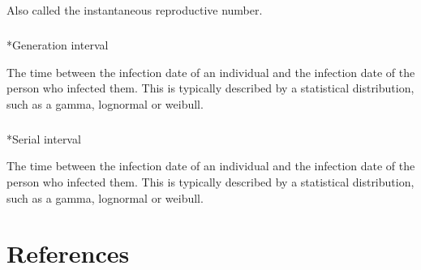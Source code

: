 \documentclass[
  letterpaper,
  DIV=11,
  numbers=noendperiod]{scrreprt}
\makeatletter
\let\oldparagraph\paragraph
\renewcommand{\paragraph}{
    \@ifstar
      \xxxParagraphStar
      \xxxParagraphNoStar
  }
\newcommand{\xxxParagraphStar}[1]{\oldparagraph*{#1}\mbox{}}
\newcommand{\xxxParagraphNoStar}[1]{\oldparagraph{#1}\mbox{}}
\makeatother
\begin{document}
Also called the instantaneous reproductive number.

\paragraph*{Generation interval}\label{genInt}

The time between the infection date of an individual and the infection
date of the person who infected them. This is typically described by a
statistical distribution, such as a gamma, lognormal or weibull.

\paragraph*{Serial interval}\label{serialInt}

The time between the infection date of an individual and the infection
date of the person who infected them. This is typically described by a
statistical distribution, such as a gamma, lognormal or weibull.


\chapter*{References}\label{references}

\end{document}
